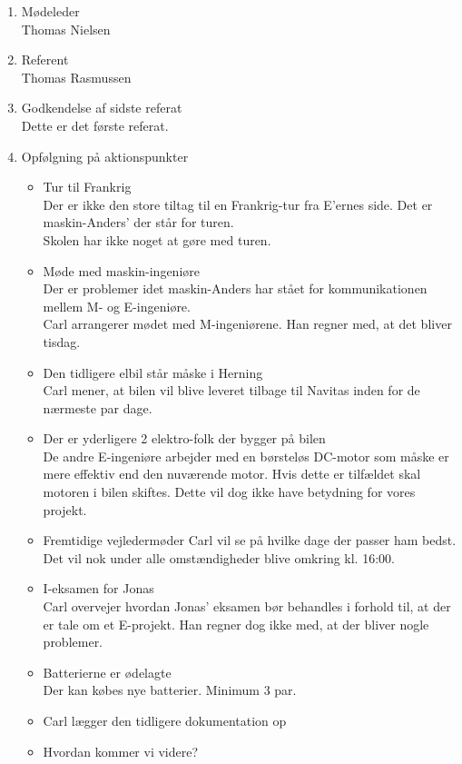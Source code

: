	\begin{enumerate}
		\itemsep 0.3em 
		\item Mødeleder\\
			Thomas Nielsen
		\item Referent\\
			Thomas Rasmussen
		\item Godkendelse af sidste referat\\
			Dette er det første referat.
		\item Opfølgning på aktionspunkter
		\begin{itemize}
			\itemsep 0.3em 
			\item Tur til Frankrig\\
				Der er ikke den store tiltag til en Frankrig-tur fra E'ernes side. Det er maskin-Anders' der står for turen.\\
				Skolen har ikke noget at gøre med turen.
			\item Møde med maskin-ingeniøre\\
				Der er problemer idet maskin-Anders har stået for kommunikationen mellem M- og E-ingeniøre.\\
				Carl arrangerer mødet med M-ingeniørene. Han regner med, at det bliver tisdag.
			\item Den tidligere elbil står måske i Herning\\
				Carl mener, at bilen vil blive leveret tilbage til Navitas inden for de nærmeste par dage.
			\item Der er yderligere 2 elektro-folk der bygger på bilen\\
				De andre E-ingeniøre arbejder med en børsteløs DC-motor som måske er mere effektiv end den nuværende motor. Hvis dette er tilfældet skal motoren i bilen skiftes. Dette vil dog ikke have betydning for vores projekt.
			\item Fremtidige vejledermøder
				Carl vil se på hvilke dage der passer ham bedst. Det vil nok under alle omstændigheder blive omkring kl. 16:00.
			\item I-eksamen for Jonas\\
				Carl overvejer hvordan Jonas' eksamen bør behandles i forhold til, at der er tale om et E-projekt. Han regner dog ikke med, at der bliver nogle problemer.
			\item Batterierne er ødelagte\\
				Der kan købes nye batterier. Minimum 3 par.
			\item Carl lægger den tidligere dokumentation op
			\item Hvordan kommer vi videre?\\

\end{itemize}
\end{enumerate}
